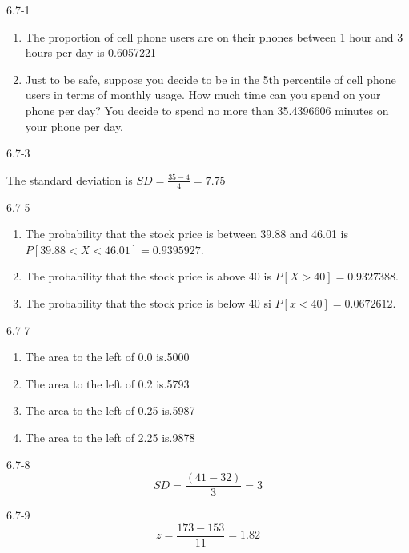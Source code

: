 \begin{exsol@solution}{6.7-1}

\begin{enumerate}
	\item The proportion of cell phone users are on their phones between 1 hour
and 3 hours per day is 0.6057221
  \item Just to be safe, suppose you decide to be in the 5th percentile of
cell phone users in terms of monthly usage.  How much time can you spend on your phone per day? You decide to spend no more than 35.4396606 minutes on your phone per day.
	\end{enumerate}
\end{exsol@solution}
\begin{exsol@solution}{6.7-3}


    The standard deviation is $SD = \frac{35 - 4}{4} = 7.75$
\end{exsol@solution}
\begin{exsol@solution}{6.7-5}

\begin{enumerate}
\item The probability that the stock price is between 39.88 and 46.01 is $P[39.88 < X < 46.01] = 0.9395927$.
\item The probability that the stock price is above 40 is $P[X > 40] = 0.9327388$.
\item The probability that the stock price is below 40 si $P[ x < 40] = 0.0672612$.
\end{enumerate}
\end{exsol@solution}
\begin{exsol@solution}{6.7-7}
\begin{enumerate}
\item The area to the left of 0.0 is.5000
\item The area to the left of 0.2 is.5793
\item The area to the left of 0.25 is.5987
\item The area to the left of 2.25 is.9878
\end{enumerate}
\end{exsol@solution}
\begin{exsol@solution}{6.7-8}
	  \begin{equation}
	    SD = \frac{(41 - 32)}{3} = 3
	  \end{equation}
\end{exsol@solution}
\begin{exsol@solution}{6.7-9}
	  \begin{equation}
	    z = \frac{173 - 153}{11} = 1.82
	  \end{equation}
\end{exsol@solution}

